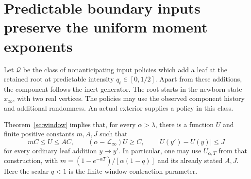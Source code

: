 \section{Predictable boundary inputs preserve the uniform moment exponents}
\label{cm:section}

Let $\mathcal Q$ be the class of nonanticipating input policies which add
a leaf at the retained root at predictable intensity $q_t\in[0,1/2]$.
Apart from these additions, the component follows the inert generator.
The root starts in the newborn state $x_\infty$, with two real vertices.
The policies may use the observed component history and additional
randomness. An actual exterior supplies a policy in this class.

Theorem~\ref{sc:window} implies that,
for every $\alpha>\lambda$, there is a function $U$ and finite positive
constants $m,A,J$ such that
\begin{equation}\label{cm:window-input}
 mC\le U\le AC,\qquad
 (\alpha-\mathcal L_\infty)U\ge C,\qquad
 |U(y')-U(y)|\le J
\end{equation}
for every ordinary leaf addition $y\to y'$. In particular, one may use
$U_{\alpha,T}$ from that construction, with
$m=(1-e^{-\alpha T})/[\alpha(1-q)]$ and its already stated $A,J$.
Here the scalar $q<1$ is the finite-window contraction parameter.

